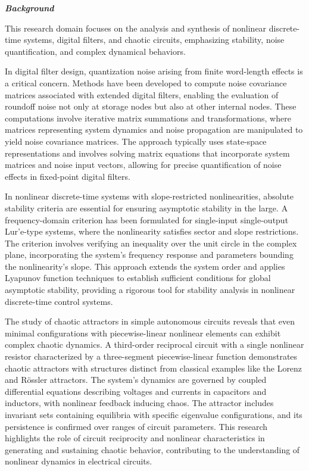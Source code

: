 \begin{tcolorbox}[
    breakable,
    title=Example of Wet Experiment in Physics,
    colback=LighterGray,
    colframe=DeepPurple,
    colbacktitle=DeepPurple,
    coltitle=White,
]
\textbf{\emph{\textcolor{DeepPurple}{Background}}}

This research domain focuses on the analysis and synthesis of nonlinear discrete-time systems, digital filters, and chaotic circuits, emphasizing stability, noise quantification, and complex dynamical behaviors.

In digital filter design, quantization noise arising from finite word-length effects is a critical concern. Methods have been developed to compute noise covariance matrices associated with extended digital filters, enabling the evaluation of roundoff noise not only at storage nodes but also at other internal nodes. These computations involve iterative matrix summations and transformations, where matrices representing system dynamics and noise propagation are manipulated to yield noise covariance matrices. The approach typically uses state-space representations and involves solving matrix equations that incorporate system matrices and noise input vectors, allowing for precise quantification of noise effects in fixed-point digital filters.

In nonlinear discrete-time systems with slope-restricted nonlinearities, absolute stability criteria are essential for ensuring asymptotic stability in the large. A frequency-domain criterion has been formulated for single-input single-output Lur'e-type systems, where the nonlinearity satisfies sector and slope restrictions. The criterion involves verifying an inequality over the unit circle in the complex plane, incorporating the system's frequency response and parameters bounding the nonlinearity's slope. This approach extends the system order and applies Lyapunov function techniques to establish sufficient conditions for global asymptotic stability, providing a rigorous tool for stability analysis in nonlinear discrete-time control systems.

The study of chaotic attractors in simple autonomous circuits reveals that even minimal configurations with piecewise-linear nonlinear elements can exhibit complex chaotic dynamics. A third-order reciprocal circuit with a single nonlinear resistor characterized by a three-segment piecewise-linear function demonstrates chaotic attractors with structures distinct from classical examples like the Lorenz and Rössler attractors. The system's dynamics are governed by coupled differential equations describing voltages and currents in capacitors and inductors, with nonlinear feedback inducing chaos. The attractor includes invariant sets containing equilibria with specific eigenvalue configurations, and its persistence is confirmed over ranges of circuit parameters. This research highlights the role of circuit reciprocity and nonlinear characteristics in generating and sustaining chaotic behavior, contributing to the understanding of nonlinear dynamics in electrical circuits.


\end{tcolorbox}
